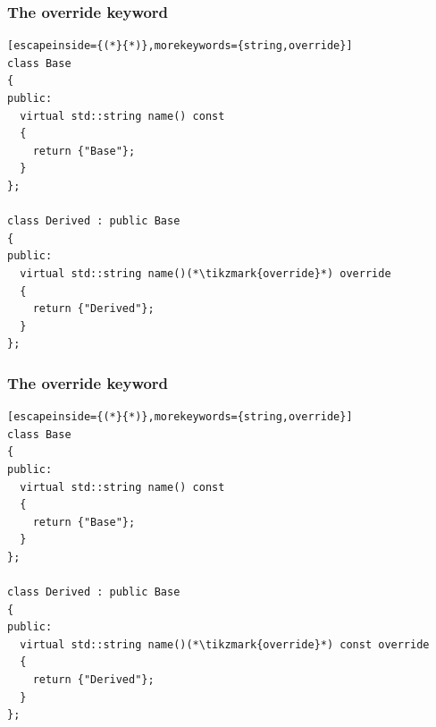 \documentclass[14pt,a4paper,dvipsnames,usenames]{beamer}
\begin{document}
\begin{frame}[fragile]
  \frametitle{The {\color{FeebleWeek}override} keyword}

  \begin{lstlisting}[escapeinside={(*}{*)},morekeywords={string,override}]
class Base
{
public:
  virtual std::string name() const
  {
    return {"Base"};
  }
};

class Derived : public Base
{
public:
  virtual std::string name()(*\tikzmark{override}*) override
  {
    return {"Derived"};
  }
};
  \end{lstlisting}

  \nointerlineskip

  \CPPEleven
  
\end{frame}

\begin{frame}[fragile]
  \frametitle{The {\color{FeebleWeek}override} keyword}

  \begin{lstlisting}[escapeinside={(*}{*)},morekeywords={string,override}]
class Base
{
public:
  virtual std::string name() const
  {
    return {"Base"};
  }
};

class Derived : public Base
{
public:
  virtual std::string name()(*\tikzmark{override}*) const override
  {
    return {"Derived"};
  }
};
  \end{lstlisting}

  \nointerlineskip

  \CPPEleven
  
\end{frame}
\end{document}

